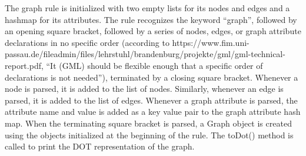 \documentclass[a4paper]{report}
\begin{document}
The graph rule is initialized with two empty lists for its nodes and edges and a hashmap for its attributes. The rule recognizes the keyword ``graph'', followed by an opening square bracket, followed by a series of nodes, edges, or graph attribute declarations in no specific order (according to https://www.fim.uni-passau.de/fileadmin/files/lehrstuhl/brandenburg/projekte/gml/gml-technical-report.pdf, ``It (GML) should be flexible enough that a specific order of declarations is not needed''), terminated by a closing square bracket. Whenever a node is parsed, it is added to the list of nodes. Similarly, whenever an edge is parsed, it is added to the list of edges. Whenever a graph attribute is parsed, the attribute name and value is added as a key value pair to the graph attribute hash map. When the terminating square bracket is parsed, a Graph object is created using the objects initialized at the beginning of the rule. The toDot() method is called to print the DOT representation of the graph. 
\end{document}
